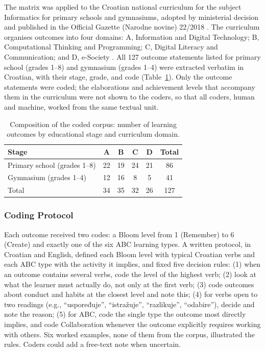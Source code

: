 \documentclass[journal,article,submit,pdftex,moreauthors]{Definitions/mdpi}
\begin{document}
The matrix was applied to the Croatian national curriculum for the subject Informatics for primary schools and gymnasiums, adopted by ministerial decision and published in the Official Gazette (Narodne novine) 22/2018 \cite{croatia_informatics_2018}. The curriculum organises outcomes into four domains: A, Information and Digital Technology; B, Computational Thinking and Programming; C, Digital Literacy and Communication; and D, e-Society \cite{croatia_informatics_2018}. All 127 outcome statements listed for primary school (grades 1--8) and gymnasium (grades 1--4) were extracted verbatim in Croatian, with their stage, grade, and code (Table~\ref{tab:corpus}). Only the outcome statements were coded; the elaborations and achievement levels that accompany them in the curriculum were not shown to the coders, so that all coders, human and machine, worked from the same textual unit.

\begin{table}[H]
\caption{Composition of the coded corpus: number of learning outcomes by educational stage and curriculum domain.}
\label{tab:corpus}
\centering
\footnotesize
\begin{tabular}{lccccc}
\toprule
\textbf{Stage} & \textbf{A} & \textbf{B} & \textbf{C} & \textbf{D} & \textbf{Total} \\
\midrule
Primary school (grades 1--8) & 22 & 19 & 24 & 21 & 86 \\
Gymnasium (grades 1--4) & 12 & 16 & 8 & 5 & 41 \\
\midrule
Total & 34 & 35 & 32 & 26 & 127 \\
\bottomrule
\end{tabular}
\end{table}

\subsubsection{Coding Protocol}

Each outcome received two codes: a Bloom level from 1 (Remember) to 6 (Create) and exactly one of the six ABC learning types. A written protocol, in Croatian and English, defined each Bloom level with typical Croatian verbs and each ABC type with the activity it implies, and fixed five decision rules: (1) when an outcome contains several verbs, code the level of the highest verb; (2) look at what the learner must actually do, not only at the first verb; (3) code outcomes about conduct and habits at the closest level and note this; (4) for verbs open to two readings (e.g., ``uspoređuje'', ``istražuje'', ``razlikuje'', ``odabire''), decide and note the reason; (5) for ABC, code the single type the outcome most directly implies, and code Collaboration whenever the outcome explicitly requires working with others. Six worked examples, none of them from the corpus, illustrated the rules. Coders could add a free-text note when uncertain.
\end{document}
